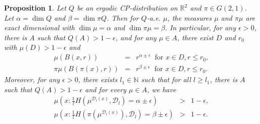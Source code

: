 \documentclass[a4paper,11pt]{amsart}
\newtheorem{proposition}[theorem]{Proposition}
\theoremstyle{definition}
\numberwithin{equation}{section}
\def\D{\mathcal{D}}
\def\N{\mathbb N}
\def\R{\mathbb R}
\begin{document}
\begin{proposition}\label{prop:dim-projection-cp-distribution:1}
Let $Q$ be an ergodic CP-distribution on $\R^2$ and $\pi\in G(2,1)$.  Let $\alpha=\dim Q$ and $\beta=\dim \pi Q$. Then for $Q$-a.e.  $\mu$,  the measures $\mu$ and $\pi \mu$ are exact dimensional with $\dim \mu=\alpha$ and $\dim \pi \mu=\beta$.   In particular, for any $\epsilon>0$,  there is  $A$ such that $Q(A)>1-\epsilon$,  and for any $ \mu\in A$,  there exist $D$ and $r_0$ with $\mu(D)>1-\epsilon$ and 
\begin{eqnarray}
 \mu(B(x,r)) & = & r^{\alpha\pm \epsilon} \  \textrm{ for } x\in D,  r\le r_0,  \label{eq:prop:dim-projection-cp-distribution:1:1}\\
\pi\mu(B(\pi(x),r)) & = & r^{\beta\pm \epsilon} \  \textrm{ for } x\in D,  r\le r_0.\label{eq:prop:dim-projection-cp-distribution:1:2}
\end{eqnarray}
Moreover, for any $\epsilon>0$, there exists $l_1\in \N$ such that for all $l\ge l_1$, there is $A$ such that $Q(A)>1-\epsilon$ and for every $\mu\in A$, we have
\begin{eqnarray}
\mu\left( x: \frac{1}{l}H\left(\mu^{\D_l(x)},\D_l\right)  =  \alpha\pm \epsilon \right) &>& 1-\epsilon, \label{eq:prop:dim-projection-cp-distribution:1:3}\\
\mu\left( x: \frac{1}{l}H\left(\pi\left(\mu^{\D_l(x)}\right),\D_l\right) =  \beta\pm \epsilon \right) &>& 1-\epsilon.\label{eq:prop:dim-projection-cp-distribution:1:4}
\end{eqnarray}
\end{proposition}
\end{document}
